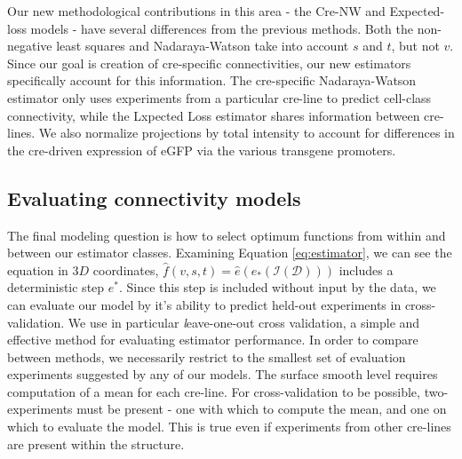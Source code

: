 Our new methodological contributions in this area - the Cre-NW and Expected-loss models - have several differences from the previous methods.
Both the \citet{Oh2014-kh} non-negative least squares and \citet{Knox2019-ot} Nadaraya-Watson take into account $s$ and $t$, but not $v$.
Since our goal is creation of cre-specific connectivities, our new estimators specifically account for this information.
The cre-specific Nadaraya-Watson estimator only uses experiments from a particular cre-line to predict cell-class connectivity, while the Lxpected Loss estimator shares information between cre-lines.
We also normalize projections by total intensity to account for differences in the cre-driven expression of eGFP via the various transgene promoters.



\subsection{Evaluating connectivity models}

The final modeling question is how to select optimum functions from within and between our estimator classes.
Examining Equation \ref{eq:estimator}, we can see the equation in $3D$ coordinates, $\widehat f(v,s,t) = \widehat e (e_*(\mathcal{I} (\mathcal D)))$ includes a deterministic step $e^*$.  Since this step is included without input by the data, we can evaluate our model by it's ability to predict held-out experiments in cross-validation.
We use in particular {\textit leave-one-out cross validation}, a simple and effective method for evaluating estimator performance.
In order to compare between methods, we necessarily restrict to the smallest set of evaluation experiments suggested by any of our models.
The surface smooth level requires computation of a mean for each cre-line.
For cross-validation to be possible, two-experiments must be present - one with which to compute the mean, and one on which to evaluate the model.
This is true even if experiments from other cre-lines are present within the structure.

